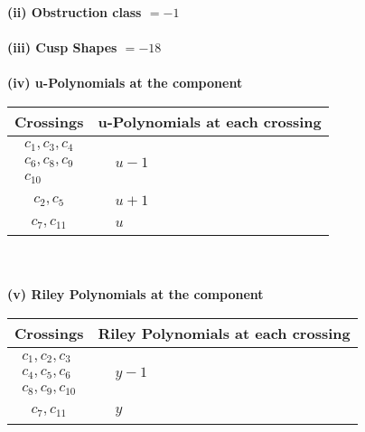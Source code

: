 \documentclass[1p]{elsarticle_modified}
\theoremstyle{definition}
\begin{document}
\flushleft \textbf{(ii) Obstruction class $= -1$}\\~\\
\flushleft \textbf{(iii) Cusp Shapes $= -18$}\\~\\
\newpage\renewcommand{\arraystretch}{1}
\flushleft \textbf{(iv) u-Polynomials at the component}\newline \\
\begin{tabular}{m{50pt}|m{274pt}}
Crossings & \hspace{64pt}u-Polynomials at each crossing \\
\hline $$\begin{aligned}c_{1},c_{3},c_{4}\\c_{6},c_{8},c_{9}\\c_{10}\end{aligned}$$&$\begin{aligned}
&u-1
\end{aligned}$\\
\hline $$\begin{aligned}c_{2},c_{5}\end{aligned}$$&$\begin{aligned}
&u+1
\end{aligned}$\\
\hline $$\begin{aligned}c_{7},c_{11}\end{aligned}$$&$\begin{aligned}
&u
\end{aligned}$\\
\hline
\end{tabular}\\~\\
\newpage\renewcommand{\arraystretch}{1}
\flushleft \textbf{(v) Riley Polynomials at the component}\newline \\
\begin{tabular}{m{50pt}|m{274pt}}
Crossings & \hspace{64pt}Riley Polynomials at each crossing \\
\hline $$\begin{aligned}c_{1},c_{2},c_{3}\\c_{4},c_{5},c_{6}\\c_{8},c_{9},c_{10}\end{aligned}$$&$\begin{aligned}
&y-1
\end{aligned}$\\
\hline $$\begin{aligned}c_{7},c_{11}\end{aligned}$$&$\begin{aligned}
&y
\end{aligned}$\\
\hline
\end{tabular}\\~\\
\end{document}
